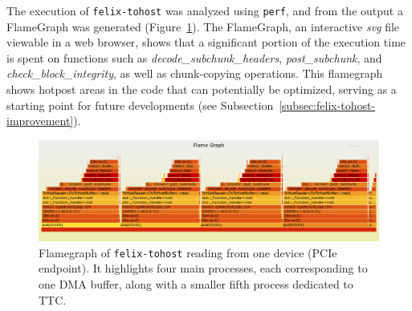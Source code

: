 The execution of \texttt{felix-tohost} was analyzed using \texttt{perf}, and from the output a FlameGraph \cite{flamegraph} was generated (Figure~\ref{fig:felix-tohost-flamegraph}). The FlameGraph, an interactive \emph{svg} file viewable in a web browser, shows that a significant portion of the execution time is spent on functions such as \emph{decode\_subchunk\_headers}, \emph{post\_subchunk}, and \emph{check\_block\_integrity}, as well as chunk-copying operations. This flamegraph shows hotpost areas in the code that can potentially be optimized, serving as a starting point for future developments (see Subsection~\ref{subsec:felix-tohost-improvement}).

\begin{figure}[htbp]
\centering
\includegraphics[width=\textwidth]{images/results/flamegraph.png}
\caption[Flamegraph of felix-tohost]{Flamegraph of \texttt{felix-tohost} reading from one device (PCIe endpoint). It highlights four main processes, each corresponding to one \acs{DMA} buffer, along with a smaller fifth process dedicated to \acs{TTC}.}\label{fig:felix-tohost-flamegraph}
\end{figure}